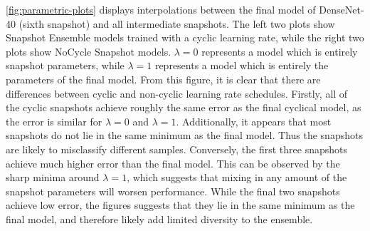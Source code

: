\autoref{fig:parametric-plots} displays interpolations between the final model of DenseNet-40 (sixth snapshot) and all intermediate snapshots. The left two plots show Snapshot Ensemble models trained with a cyclic learning rate, while the right two plots show NoCycle Snapshot models.
$\lambda=0$ represents a model which is entirely snapshot parameters, while $\lambda=1$ represents a model which is entirely the parameters of the final model.
From this figure, it is clear that there are differences between cyclic and non-cyclic learning rate schedules.
Firstly, all of the cyclic snapshots achieve roughly the same error as the final cyclical model, as the error is similar for $\lambda=0$ and $\lambda=1$.
Additionally, it appears that most snapshots do not lie in the same minimum as the final model. Thus the snapshots are likely to misclassify different samples.
Conversely, the first three snapshots achieve much higher error than the final model. This can be observed by the sharp minima around $\lambda=1$, which suggests that mixing in any amount of the snapshot parameters will worsen performance. While the final two snapshots achieve low error, the figures suggests that they lie in the same minimum as the final model, and therefore likely add limited diversity to the ensemble.





